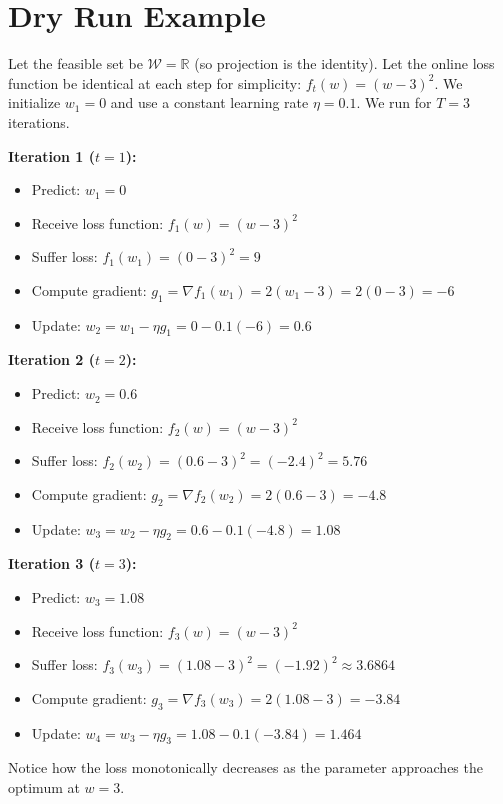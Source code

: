 \documentclass[11pt]{article}
\begin{document}
\section*{Dry Run Example}
Let the feasible set be $\mathcal{W} = \mathbb{R}$ (so projection is the identity). Let the online loss function be identical at each step for simplicity: $f_t(w) = (w-3)^2$. We initialize $w_1 = 0$ and use a constant learning rate $\eta = 0.1$. We run for $T=3$ iterations.

\textbf{Iteration 1 ($t=1$):}
\begin{itemize}
    \item Predict: $w_1 = 0$
    \item Receive loss function: $f_1(w) = (w-3)^2$
    \item Suffer loss: $f_1(w_1) = (0-3)^2 = 9$
    \item Compute gradient: $g_1 = \nabla f_1(w_1) = 2(w_1 - 3) = 2(0 - 3) = -6$
    \item Update: $w_2 = w_1 - \eta g_1 = 0 - 0.1(-6) = 0.6$
\end{itemize}

\textbf{Iteration 2 ($t=2$):}
\begin{itemize}
    \item Predict: $w_2 = 0.6$
    \item Receive loss function: $f_2(w) = (w-3)^2$
    \item Suffer loss: $f_2(w_2) = (0.6-3)^2 = (-2.4)^2 = 5.76$
    \item Compute gradient: $g_2 = \nabla f_2(w_2) = 2(0.6 - 3) = -4.8$
    \item Update: $w_3 = w_2 - \eta g_2 = 0.6 - 0.1(-4.8) = 1.08$
\end{itemize}

\textbf{Iteration 3 ($t=3$):}
\begin{itemize}
    \item Predict: $w_3 = 1.08$
    \item Receive loss function: $f_3(w) = (w-3)^2$
    \item Suffer loss: $f_3(w_3) = (1.08-3)^2 = (-1.92)^2 \approx 3.6864$
    \item Compute gradient: $g_3 = \nabla f_3(w_3) = 2(1.08 - 3) = -3.84$
    \item Update: $w_4 = w_3 - \eta g_3 = 1.08 - 0.1(-3.84) = 1.464$
\end{itemize}
Notice how the loss monotonically decreases as the parameter approaches the optimum at $w=3$.
\end{document}
